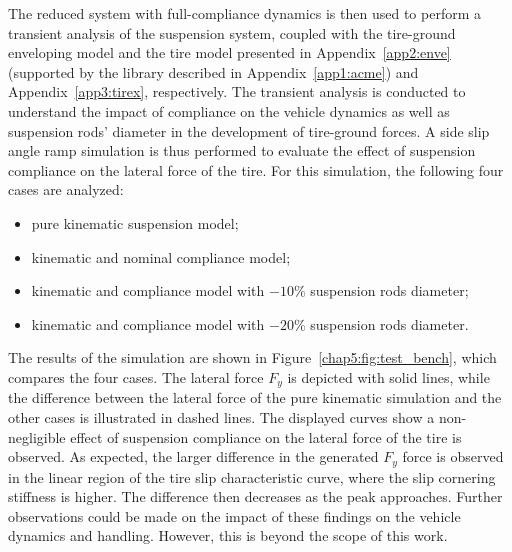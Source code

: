 The reduced system with full-compliance dynamics is then used to perform a transient analysis of the suspension system, coupled with the tire-ground enveloping model and the tire model presented in Appendix~\ref{app2:enve} (supported by the \Acme{} \cpp{} library described in Appendix~\ref{app1:acme}) and Appendix~\ref{app3:tirex}, respectively. The transient analysis is conducted to understand the impact of compliance on the vehicle dynamics as well as suspension rods' diameter in the development of tire-ground forces. A side slip angle ramp simulation is thus performed to evaluate the effect of suspension compliance on the lateral force of the tire. For this simulation, the following four cases are analyzed:
%
\begin{itemize}
  \setlength\itemsep{0.0em}
  \item pure kinematic suspension model;
  \item kinematic and nominal compliance model;
  \item kinematic and compliance model with $-10\%$ suspension rods diameter;
  \item kinematic and compliance model with $-20\%$ suspension rods diameter.
\end{itemize}
%
The results of the simulation are shown in Figure~\ref{chap5:fig:test_bench}, which compares the four cases. The lateral force $F_y$ is depicted with solid lines, while the difference between the lateral force of the pure kinematic simulation and the other cases is illustrated in dashed lines. The displayed curves show a non-negligible effect of suspension compliance on the lateral force of the tire is observed. As expected, the larger difference in the generated $F_y$ force is observed in the linear region of the tire slip characteristic curve, where the slip cornering stiffness is higher. The difference then decreases as the peak approaches. Further observations could be made on the impact of these findings on the vehicle dynamics and handling. However, this is beyond the scope of this work.

